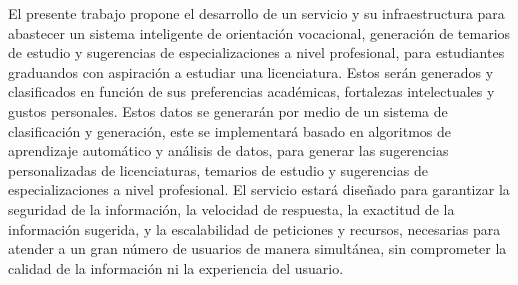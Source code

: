 El presente trabajo propone el desarrollo de un servicio y su infraestructura para abastecer un sistema inteligente de orientación vocacional, generación de temarios de estudio y sugerencias de especializaciones a nivel profesional, para estudiantes graduandos con aspiración a estudiar una licenciatura. Estos serán generados y clasificados en función de sus preferencias académicas, fortalezas intelectuales y gustos personales. Estos datos se generarán por medio de un sistema de clasificación y generación, este se implementará basado en algoritmos de aprendizaje automático y análisis de datos, para generar las sugerencias personalizadas de licenciaturas, temarios de estudio y sugerencias de especializaciones a nivel profesional. El servicio estará diseñado para garantizar la seguridad de la información, la velocidad de respuesta, la exactitud de la información sugerida, y la escalabilidad de peticiones y recursos, necesarias para atender a un gran número de usuarios de manera simultánea, sin comprometer la calidad de la información ni la experiencia del usuario.

